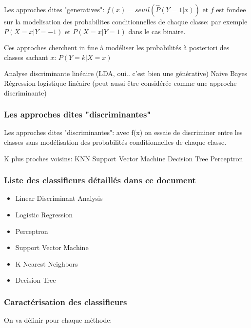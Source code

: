 \documentclass[a4paper]{article}
\theoremstyle{plain}
\begin{document}
Les approches dites "generatives": $f(x) = seuil(\hat P(Y = 1|x))$
et $f$ est fondee sur la modelisation des probabilites conditionnelles de chaque classe: par exemple $P(X=x|Y = -1)$ et $P(X=x|Y = 1)$ dans le cas binaire.

Ces approches cherchent in fine à modéliser les probabilités à posteriori des classes sachant $x$: $P(Y=k|X=x)$


\begin{outline}
\1 Analyse discriminante linéaire (LDA, oui.. c'est bien une générative)
\1 Naive Bayes
\1 Régression logistique linéaire (peut aussi être considérée comme une approche discriminante) 

\end{outline}

\subsubsection{Les approches dites "discriminantes"}

Les approches dites "discriminantes": avec f(x) on essaie de
discriminer entre les classes sans modélisation des probabilités conditionnelles de chaque classe.

\begin{outline}
\1 K plus proches voisins: KNN
\1 Support Vector Machine
\1 Decision Tree
\1 Perceptron

\end{outline}


\subsubsection{Liste des classifieurs détaillés dans ce document}
\begin{itemize}
\item Linear Discriminant Analysis
\item Logistic Regression
\item Perceptron
\item Support Vector Machine
\item K Nearest Neighbors 
\item Decision Tree
\end{itemize}


\subsubsection{Caractérisation des classifieurs}

On va définir pour chaque méthode:
\end{document}
